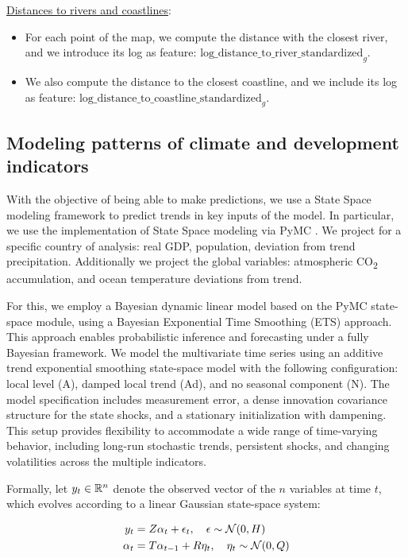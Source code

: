 \underline{Distances to rivers and coastlines}:
\begin{itemize}
    \item For each point of the map, we compute the distance with the closest river, and we introduce its log as feature: $\text{log\_distance\_to\_river\_standardized}_{g}$.
    \item We also compute the distance to the closest coastline, and we include its log as feature: $\text{log\_distance\_to\_coastline\_standardized}_{g}$.
\end{itemize}

\subsection{Modeling patterns of climate and development indicators}

With the objective of being able to make predictions, we use a State Space modeling framework to predict trends in key inputs of the model. In particular, we use the implementation of State Space modeling via PyMC \citep{pymc-extras-statespace}. We project for a specific country of analysis: real GDP, population, deviation from trend precipitation. Additionally we project the global variables: atmospheric CO\textsubscript{2} accumulation, and ocean temperature deviations from trend.

For this, we employ a Bayesian dynamic linear model based on the PyMC state-space module, using a Bayesian Exponential Time Smoothing (ETS) \citep{ets_time_series} approach. This approach enables probabilistic inference and forecasting under a fully Bayesian framework. We model the multivariate time series using an additive trend exponential smoothing state-space model with the following configuration: local level (A), damped local trend (Ad), and no seasonal component (N). The model specification includes measurement error, a dense innovation covariance structure for the state shocks, and a stationary initialization with dampening. This setup provides flexibility to accommodate a wide range of time-varying behavior, including long-run stochastic trends, persistent shocks, and changing volatilities across the multiple indicators.

Formally, let $y_t \in \mathbb{R}^n$ denote the observed vector of the $n$ variables at time $t$, which evolves according to a linear Gaussian state-space system:

\begin{align}
y_t &= Z\alpha_t + \epsilon_t, \quad \epsilon \sim \mathcal{N}(0, H) \\
\alpha_t &= T\alpha_{t-1} + R\eta_t, \quad \eta_t \sim \mathcal{N}(0, Q)
\end{align}

